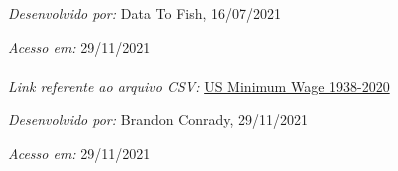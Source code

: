 \begin{itemize}
  	  \textit{Desenvolvido por:} Data To Fish, 16/07/2021
  	  
  	  \textit{Acesso em:} 29/11/2021
  	  \\ \\
  	  \textit{Link referente ao arquivo CSV:}
  	  \href{https://www.kaggle.com/brandonconrady/us-minimum-wage-1938-2020}{US Minimum Wage 1938-2020}
  	  
  	  \textit{Desenvolvido por:} Brandon Conrady, 29/11/2021
  	  
  	  \textit{Acesso em:} 29/11/2021  	
  \end{itemize}